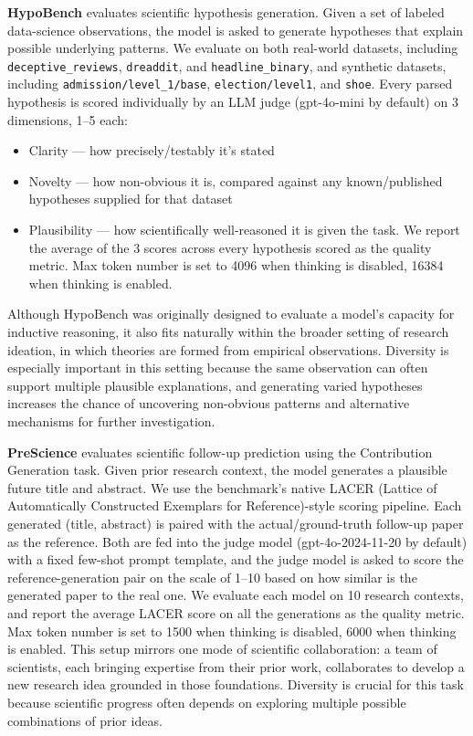 \textbf{HypoBench} \citep{liu2026hypobenchsystematicprincipledbenchmarking} evaluates scientific hypothesis generation. Given a set of labeled data-science observations, the model is asked to generate hypotheses that explain possible underlying patterns. We evaluate on both real-world datasets, including \texttt{deceptive\_reviews}, \texttt{dreaddit}, and \texttt{headline\_binary}, and synthetic datasets, including \texttt{admission\//level\_1\//base}, \texttt{election\//level1}, and \texttt{shoe}. Every parsed hypothesis is scored individually by an LLM judge (gpt-4o-mini by default) on 3 dimensions, 1–5 each:
\begin{itemize}
    \item Clarity — how precisely/testably it's stated
    \item  Novelty — how non-obvious it is, compared against any known/published hypotheses
       supplied for that dataset
     \item Plausibility — how scientifically well-reasoned it is given the task. We report the average of the 3 scores across every hypothesis scored as the quality metric. Max token number is set to 4096 when thinking is disabled, 16384 when thinking is enabled.
\end{itemize}
Although HypoBench was originally designed to evaluate a model's capacity for inductive reasoning, it also fits naturally within the broader setting of research ideation, in which theories are formed from empirical observations. Diversity is especially important in this setting because the same observation can often support multiple plausible explanations, and generating varied hypotheses increases the chance of uncovering non-obvious patterns and alternative mechanisms for further investigation.

\textbf{PreScience} \citep{Ajith2026} evaluates scientific follow-up prediction using the Contribution Generation task. Given prior research context, the model generates a plausible future title and abstract. We use the benchmark's native LACER (Lattice of Automatically Constructed Exemplars for Reference)-style scoring pipeline. Each generated (title, abstract) is paired with the actual/ground-truth follow-up paper as the reference. Both are fed into the judge model (gpt-4o-2024-11-20 by default) with a fixed few-shot prompt template, and the judge model is asked to score the reference-generation pair on the scale of 1–10 based on how similar is the generated paper to the real one. We evaluate each model on 10 research contexts, and report the average LACER score on all the generations as the quality metric. Max token number is set to 1500 when thinking is disabled, 6000 when thinking is enabled. This setup mirrors one mode of scientific collaboration: a team of scientists, each bringing expertise from their prior work, collaborates to develop a new research idea grounded in those foundations. Diversity is crucial for this task because scientific progress often depends on exploring multiple possible combinations of prior ideas.

